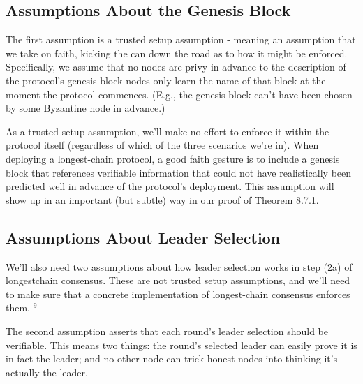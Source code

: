 \subsection{Assumptions About the Genesis Block}

The first assumption is a trusted setup assumption - meaning an assumption that we take on faith, kicking the can down the road as to how it might be enforced. Specifically, we assume that no nodes are privy in advance to the description of the protocol's genesis block-nodes only learn the name of that block at the moment the protocol commences. (E.g., the genesis block can't have been chosen by some Byzantine node in advance.)

As a trusted setup assumption, we'll make no effort to enforce it within the protocol itself (regardless of which of the three scenarios we're in). When deploying a longest-chain protocol, a good faith gesture is to include a genesis block that references verifiable information that could not have realistically been predicted well in advance of the protocol's deployment. This assumption will show up in an important (but subtle) way in our proof of Theorem 8.7.1.

\subsection{Assumptions About Leader Selection}

We'll also need two assumptions about how leader selection works in step (2a) of longestchain consensus. These are not trusted setup assumptions, and we'll need to make sure that a concrete implementation of longest-chain consensus enforces them. ${ }^{9}$


The second assumption asserts that each round's leader selection should be verifiable. This means two things: the round's selected leader can easily prove it is in fact the leader; and no other node can trick honest nodes into thinking it's actually the leader.

